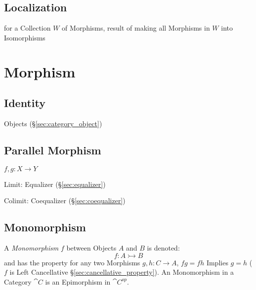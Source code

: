 \subsection{Localization}\label{sec:category_localization}

for a Collection $W$ of Morphisms, result of making all Morphisms in
$W$ into Isomorphisms




\section{Morphism}\label{sec:morphism}

\subsection{Identity}\label{sec:identity_morphism}

Objects (\S\ref{sec:category_object})



\subsection{Parallel Morphism}\label{sec:parallel_morphism}

$f,g : X \rightarrow Y$

Limit: Equalizer (\S\ref{sec:equalizer})

Colimit: Coequalizer (\S\ref{sec:coequalizer})



\subsection{Monomorphism}\label{sec:monomorphism}

A \emph{Monomorphism} $f$ between Objects $A$ and $B$ is denoted:
\[
  f : A \rightarrowtail B
\]
and has the property for any two Morphisms $g, h : C \rightarrow A$,
$fg = fh$ Implies $g = h$ ($f$ is Left Cancellative
\S\ref{sec:cancellative_property}). An Monomorphism in a Category
$\cat{C}$ is an Epimorphism in $\cat{C^{op}}$.

